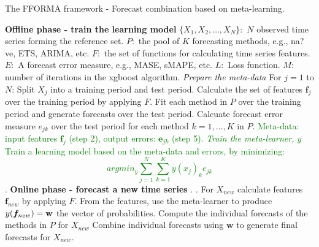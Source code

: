 \documentclass[11pt,a4paper,]{article}
\theoremstyle{definition}
\theoremstyle{definition}
\theoremstyle{definition}
\theoremstyle{remark}
\begin{document}
\begin{algorithm}[!ht]
  \caption{The FFORMA framework - Forecast combination based on meta-learning. }
  \label{alg:algo-lab}
  \begin{algorithmic}[1]
    \Statex \textbf{Offline phase - train the learning model}
    \Statex {}
    \Statex \hspace{1cm}$\{X_1, X_2, \dots,X_N\}:$ $N$ observed time series forming the reference set.
      \Statex \hspace{1cm}$P:$ the pool of $K$ forecasting methods, e.g., na?ve, ETS, ARIMA, etc.
         \Statex \hspace{1cm}$F:$ the set of functions for calculating time series features.
         \Statex \hspace{1cm}$E:$ A forecast error measure, e.g., MASE, sMAPE, etc.
           \Statex \hspace{1cm}$L:$ Loss function.
           \Statex \hspace{1cm}$M:$ number of iterations in the xgboost algorithm.
     \Statex {}
      \Statex \hspace{1cm}
      \Statex {}
    \Statex \textit{Prepare the meta-data}
    \Statex For $j=1$ to $N$:
            \State Split $X_j$ into a training period and test period.
            \State Calculate the set of features $\bm{f}_j$ over the training period by applying $F$.
            \State Fit each method in $P$ over the training period and generate forecasts over the test period.
            \State Calcuate forecast error measure  $e_{jk}$ over the test period for each method $k=1,\ldots, K$ in $P$.
 \textcolor{green}{\State Meta-data: input features $\bm{f}_j$ (step 2), output errors: $\bm{e}_{jk}$ (step 5).
     \Statex
    \Statex \textit{Train the meta-learner, $y$}
            \State Train a learning model based on the meta-data and errors, by minimizing:
            $$ argmin_y \sum_{j=1}^N \sum_{k=1}^K y(x_j)_k e_{jk}  $$
            .}
    \Statex
     \Statex \textbf{Online phase - forecast a new time series}
    \Statex {}
    \Statex \hspace{1cm} .
     \Statex {}
      \Statex \hspace{1cm}.
  \State For $X_{new}$ calculate features $\bm{f}_{new}$ by applying $F$.
  \State From the features, use the meta-learner to produce $y(\bm{f}_{new})=\bf{w}$ the vector of probabilities. 
  \State Compute the individual forecasts of the methods in $P$ for $X_{new}$
  \State Combine individual forecasts using $\bm{w}$ to generate final forecasts for {$X_{new}$}.
   \end{algorithmic}

\end{algorithm}
\end{document}
